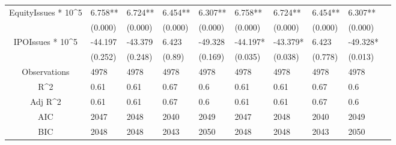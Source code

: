 \documentclass{article}
\begin{document}
\begin{table}[H]
\begin{tabular}{|clllllllll|}
  EquityIssues * 10^5 & 6.758** & 6.724** & 6.454** & 6.307** & 6.758** & 6.724** & 6.454** & 6.307** & \\ 
   & (0.000) & (0.000) & (0.000) & (0.000) & (0.000) & (0.000) & (0.000) & (0.000) & \\ 
  IPOIssues * 10^5 & -44.197 & -43.379 & 6.423 & -49.328 & -44.197* & -43.379* & 6.423 & -49.328* & \\ 
   & (0.252) & (0.248) & (0.89) & (0.169) & (0.035) & (0.038) & (0.778) & (0.013) & \\ 
  \hline 
 Observations & 4978 & 4978 & 4978 & 4978 & 4978 & 4978 & 4978 & 4978 & \\ 
  R^2 & 0.61 & 0.61 & 0.67 & 0.6 & 0.61 & 0.61 & 0.67 & 0.6 & \\ 
  Adj R^2 & 0.61 & 0.61 & 0.67 & 0.6 & 0.61 & 0.61 & 0.67 & 0.6 & \\ 
  AIC & 2047 & 2048 & 2040 & 2049 & 2047 & 2048 & 2040 & 2049 & \\ 
  BIC & 2048 & 2048 & 2043 & 2050 & 2048 & 2048 & 2043 & 2050 & \\ 
   \hline
\end{tabular}
 
\end{table}
\end{document}

